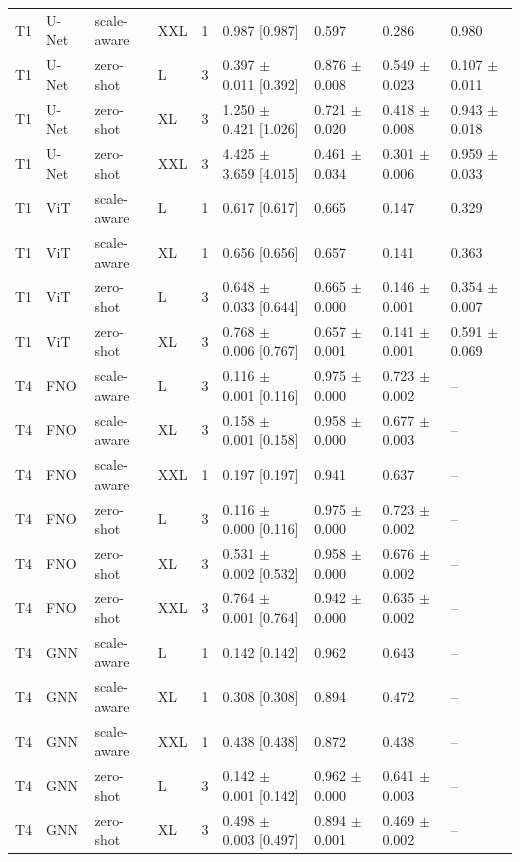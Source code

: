 \begin{table}[tb]
\begin{tabular}{lllllllll}
T1 & U-Net & scale-aware & XXL & 1 & 0.987 [0.987] & 0.597 & 0.286 & 0.980 \\
T1 & U-Net & zero-shot & L & 3 & 0.397 $\pm$ 0.011 [0.392] & 0.876 $\pm$ 0.008 & 0.549 $\pm$ 0.023 & 0.107 $\pm$ 0.011 \\
T1 & U-Net & zero-shot & XL & 3 & 1.250 $\pm$ 0.421 [1.026] & 0.721 $\pm$ 0.020 & 0.418 $\pm$ 0.008 & 0.943 $\pm$ 0.018 \\
T1 & U-Net & zero-shot & XXL & 3 & 4.425 $\pm$ 3.659 [4.015] & 0.461 $\pm$ 0.034 & 0.301 $\pm$ 0.006 & 0.959 $\pm$ 0.033 \\
T1 & ViT & scale-aware & L & 1 & 0.617 [0.617] & 0.665 & 0.147 & 0.329 \\
T1 & ViT & scale-aware & XL & 1 & 0.656 [0.656] & 0.657 & 0.141 & 0.363 \\
T1 & ViT & zero-shot & L & 3 & 0.648 $\pm$ 0.033 [0.644] & 0.665 $\pm$ 0.000 & 0.146 $\pm$ 0.001 & 0.354 $\pm$ 0.007 \\
T1 & ViT & zero-shot & XL & 3 & 0.768 $\pm$ 0.006 [0.767] & 0.657 $\pm$ 0.001 & 0.141 $\pm$ 0.001 & 0.591 $\pm$ 0.069 \\
T4 & FNO & scale-aware & L & 3 & 0.116 $\pm$ 0.001 [0.116] & 0.975 $\pm$ 0.000 & 0.723 $\pm$ 0.002 & -- \\
T4 & FNO & scale-aware & XL & 3 & 0.158 $\pm$ 0.001 [0.158] & 0.958 $\pm$ 0.000 & 0.677 $\pm$ 0.003 & -- \\
T4 & FNO & scale-aware & XXL & 1 & 0.197 [0.197] & 0.941 & 0.637 & -- \\
T4 & FNO & zero-shot & L & 3 & 0.116 $\pm$ 0.000 [0.116] & 0.975 $\pm$ 0.000 & 0.723 $\pm$ 0.002 & -- \\
T4 & FNO & zero-shot & XL & 3 & 0.531 $\pm$ 0.002 [0.532] & 0.958 $\pm$ 0.000 & 0.676 $\pm$ 0.002 & -- \\
T4 & FNO & zero-shot & XXL & 3 & 0.764 $\pm$ 0.001 [0.764] & 0.942 $\pm$ 0.000 & 0.635 $\pm$ 0.002 & -- \\
T4 & GNN & scale-aware & L & 1 & 0.142 [0.142] & 0.962 & 0.643 & -- \\
T4 & GNN & scale-aware & XL & 1 & 0.308 [0.308] & 0.894 & 0.472 & -- \\
T4 & GNN & scale-aware & XXL & 1 & 0.438 [0.438] & 0.872 & 0.438 & -- \\
T4 & GNN & zero-shot & L & 3 & 0.142 $\pm$ 0.001 [0.142] & 0.962 $\pm$ 0.000 & 0.641 $\pm$ 0.003 & -- \\
T4 & GNN & zero-shot & XL & 3 & 0.498 $\pm$ 0.003 [0.497] & 0.894 $\pm$ 0.001 & 0.469 $\pm$ 0.002 & -- \\

\end{tabular}
\end{table}

